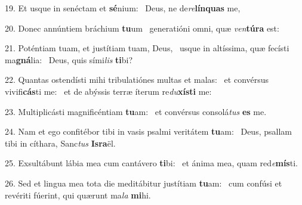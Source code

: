 19. Et usque in senéctam et \textbf{sé}nium: \ast\  Deus, ne de\textit{re}\textbf{lín}\textbf{quas} me,\

20. Donec annúntiem bráchium \textbf{tu}um \ast\  generatióni omni, quæ \textit{ven}\textbf{tú}\textbf{ra} est:\

21. Poténtiam tuam, et justítiam tuam, Deus, \dag\  usque in altíssima, quæ fecísti ma\textbf{gná}lia: \ast\  Deus, quis sími\textit{lis} \textbf{ti}bi?\

22. Quantas ostendísti mihi tribulatiónes multas et malas: \dag\  et convérsus vivifi\textbf{cás}ti me: \ast\  et de abýssis terræ íterum re\textit{du}\textbf{xís}\textbf{ti} me:\

23. Multiplicásti magnificéntiam \textbf{tu}am: \ast\  et convérsus consolá\textit{tus} \textbf{es} me.\

24. Nam et ego confitébor tibi in vasis psalmi veritátem \textbf{tu}am: \ast\  Deus, psallam tibi in cíthara, Sanc\textit{tus} \textbf{Is}\textbf{ra}ël.\

25. Exsultábunt lábia mea cum cantávero \textbf{ti}bi: \ast\  et ánima mea, quam red\textit{e}\textbf{mís}ti.\

26. Sed et lingua mea tota die meditábitur justítiam \textbf{tu}am: \ast\  cum confúsi et revériti fúerint, qui quærunt ma\textit{la} \textbf{mi}hi.\

